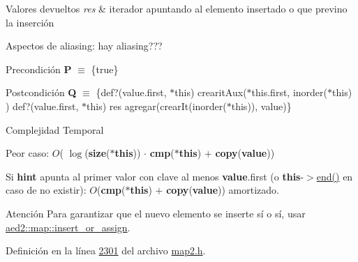 \begin{DoxyRetVals}{Valores devueltos}
{\em res} & iterador apuntando al elemento insertado o que previno la inserción\\
\hline
\end{DoxyRetVals}
\begin{DoxyParagraph}{Aspectos de aliasing\+:}
hay aliasing???
\end{DoxyParagraph}
\begin{DoxyPrecond}{Precondición}
{\bfseries P} $\equiv$ \{true\} 
\end{DoxyPrecond}
\begin{DoxyPostcond}{Postcondición}
{\bfseries Q} $\equiv$ \{def?(value.\+first, $\ast$this)  crearit\+Aux($\ast$this.first, inorder($\ast$this) )   def?(value.\+first, $\ast$this)  res  agregar(crear\+It(inorder($\ast$this)), value)\}
\end{DoxyPostcond}

\begin{DoxyDescription}
\item[Complejidad Temporal]
\begin{DoxyItemize}
\item Peor caso\+: $O$( $\log$({\bfseries size}({\bfseries $\ast$this})) $\cdot$ {\bfseries cmp}({\bfseries $\ast$this}) $+$ {\bfseries copy}({\bfseries value}))
\item Si {\bfseries hint} apunta al primer valor con clave al menos {\bfseries value}.first (o {\bfseries this}-\/$>$\hyperlink{classaed2_1_1iterator_a67caf9468be999e9be96b7add5d79946_a67caf9468be999e9be96b7add5d79946}{end()} en caso de no existir)\+: $O$({\bfseries cmp}({\bfseries $\ast$this}) $+$ {\bfseries copy}({\bfseries value})) amortizado. 
\end{DoxyItemize}
\end{DoxyDescription}

\begin{DoxyAttention}{Atención}
Para garantizar que el nuevo elemento se inserte sí o sí, usar \hyperlink{classaed2_1_1map_a2ef6723c183916276b0afc4a4c721475_a2ef6723c183916276b0afc4a4c721475}{aed2\+::map\+::insert\+\_\+or\+\_\+assign}. 
\end{DoxyAttention}


Definición en la línea \hyperlink{map2_8h_source_l02301}{2301} del archivo \hyperlink{map2_8h_source}{map2.\+h}.

\mbox{\label{classaed2_1_1iterator_a191eae4f3f076914ff1560a2fa833b70_a191eae4f3f076914ff1560a2fa833b70}} 
